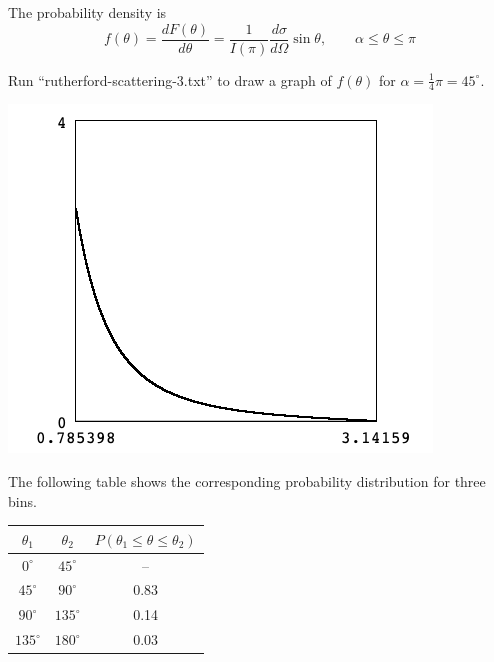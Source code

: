 \documentclass[12pt]{article}
\begin{document}
\noindent
The probability density is
\begin{equation*}
f(\theta)=\frac{dF(\theta)}{d\theta}=\frac{1}{I(\pi)}\frac{d\sigma}{d\Omega}\sin\theta,
\qquad\alpha\le\theta\le\pi
\end{equation*}

\noindent
Run ``rutherford-scattering-3.txt'' to draw a graph of $f(\theta)$ for $\alpha=\tfrac{1}{4}\pi=45^\circ$.

\begin{center}
\includegraphics[scale=0.5]{rutherford-scattering-ss1.png}
\end{center}

\noindent
The following table shows the corresponding probability distribution for three bins.

\begin{center}
\begin{tabular}{|c|c|c|}
\hline
$\theta_1$ & $\theta_2$ & $P(\theta_1\le\theta\le\theta_2)$\\
\hline
$0^\circ$ & $45^\circ$ & -- \\
$45^\circ$ & $90^\circ$ & 0.83 \\
$90^\circ$ & $135^\circ$ & 0.14 \\
$135^\circ$ & $180^\circ$ & 0.03 \\
\hline
\end{tabular}
\end{center}
\end{document}
